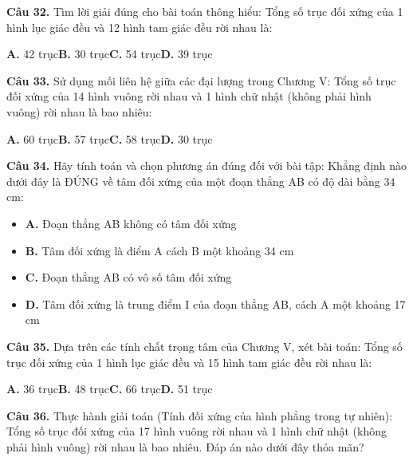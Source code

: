 \documentclass[11pt,a4paper]{article}
\begin{document}
\textbf{\color{primary} Câu 32.} Tìm lời giải đúng cho bài toán thông hiểu: Tổng số trục đối xứng của 1 hình lục giác đều và 12 hình tam giác đều rời nhau là:\par
\hspace*{1.5em}\textbf{A.} 42 trục\quad\quad \textbf{B.} 30 trục\quad\quad \textbf{C.} 54 trục\quad\quad \textbf{D.} 39 trục\par\vspace{2pt}
\textbf{\color{primary} Câu 33.} Sử dụng mối liên hệ giữa các đại lượng trong Chương V: Tổng số trục đối xứng của 14 hình vuông rời nhau và 1 hình chữ nhật (không phải hình vuông) rời nhau là bao nhiêu:\par
\hspace*{1.5em}\textbf{A.} 60 trục\quad\quad \textbf{B.} 57 trục\quad\quad \textbf{C.} 58 trục\quad\quad \textbf{D.} 30 trục\par\vspace{2pt}
\textbf{\color{primary} Câu 34.} Hãy tính toán và chọn phương án đúng đối với bài tập: Khẳng định nào dưới đây là ĐÚNG về tâm đối xứng của một đoạn thẳng AB có độ dài bằng 34 cm:\par
\begin{itemize}\setlength{\itemsep}{1pt}\setlength{\parskip}{0pt}
  \item[] \textbf{A.} Đoạn thẳng AB không có tâm đối xứng
  \item[] \textbf{B.} Tâm đối xứng là điểm A cách B một khoảng 34 cm
  \item[] \textbf{C.} Đoạn thẳng AB có vô số tâm đối xứng
  \item[] \textbf{D.} Tâm đối xứng là trung điểm I của đoạn thẳng AB, cách A một khoảng 17 cm
\end{itemize}\vspace{2pt}
\textbf{\color{primary} Câu 35.} Dựa trên các tính chất trọng tâm của Chương V, xét bài toán: Tổng số trục đối xứng của 1 hình lục giác đều và 15 hình tam giác đều rời nhau là:\par
\hspace*{1.5em}\textbf{A.} 36 trục\quad\quad \textbf{B.} 48 trục\quad\quad \textbf{C.} 66 trục\quad\quad \textbf{D.} 51 trục\par\vspace{2pt}
\textbf{\color{primary} Câu 36.} Thực hành giải toán (Tính đối xứng của hình phẳng trong tự nhiên): Tổng số trục đối xứng của 17 hình vuông rời nhau và 1 hình chữ nhật (không phải hình vuông) rời nhau là bao nhiêu. Đáp án nào dưới đây thỏa mãn?\par
\end{document}
